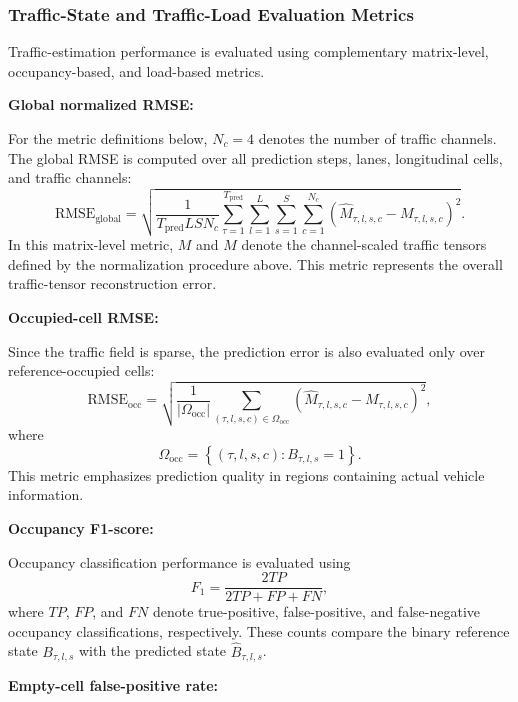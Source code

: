\documentclass[journal]{IEEEtran}
\begin{document}
\subsubsection{Traffic-State and Traffic-Load Evaluation Metrics}

Traffic-estimation performance is evaluated using complementary matrix-level, occupancy-based, and load-based metrics.

\textbf{Global normalized RMSE:}

For the metric definitions below, $N_c=4$ denotes the number of traffic channels. The global RMSE is computed over all prediction steps, lanes, longitudinal cells, and traffic channels:
\begin{equation}
\mathrm{RMSE}_{\mathrm{global}}=\sqrt{\frac{1}{T_{\mathrm{pred}}LSN_c}\sum_{\tau=1}^{T_{\mathrm{pred}}}\sum_{l=1}^{L}\sum_{s=1}^{S}\sum_{c=1}^{N_c}\left(\widehat{M}_{\tau,l,s,c}-M_{\tau,l,s,c}\right)^2}.
\end{equation}
In this matrix-level metric, $M$ and $\widehat{M}$ denote the channel-scaled traffic tensors defined by the normalization procedure above. This metric represents the overall traffic-tensor reconstruction error.

\textbf{Occupied-cell RMSE:}

Since the traffic field is sparse, the prediction error is also evaluated only over reference-occupied cells:
\begin{equation}
\mathrm{RMSE}_{\mathrm{occ}}=\sqrt{\frac{1}{|\Omega_{\mathrm{occ}}|}\sum_{(\tau,l,s,c)\in\Omega_{\mathrm{occ}}}\left(\widehat{M}_{\tau,l,s,c}-M_{\tau,l,s,c}\right)^2},
\end{equation}
where
\begin{equation}
\Omega_{\mathrm{occ}}=\left\{(\tau,l,s,c):B_{\tau,l,s}=1\right\}.
\end{equation}
This metric emphasizes prediction quality in regions containing actual vehicle information.

\textbf{Occupancy F1-score:}

Occupancy classification performance is evaluated using
\begin{equation}
F_1=\frac{2TP}{2TP+FP+FN},
\end{equation}
where $TP$, $FP$, and $FN$ denote true-positive, false-positive, and false-negative occupancy classifications, respectively. These counts compare the binary reference state $B_{\tau,l,s}$ with the predicted state $\widehat{B}_{\tau,l,s}$.

\textbf{Empty-cell false-positive rate:}
\end{document}
